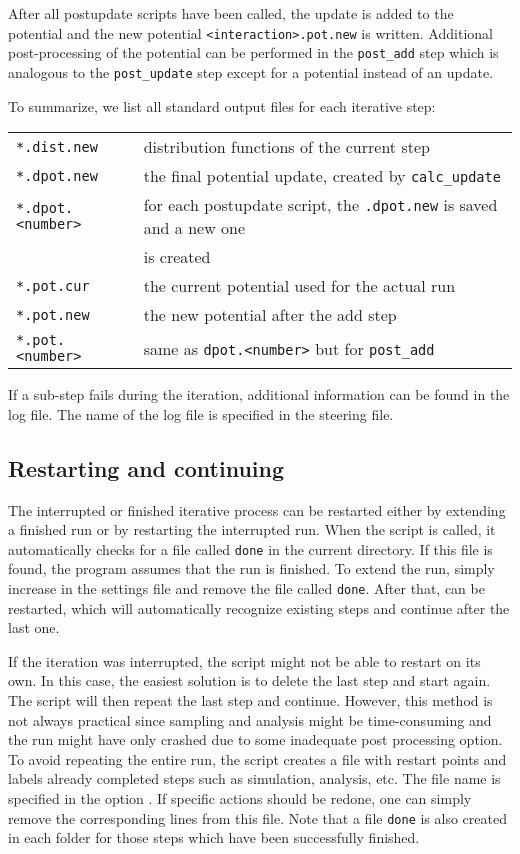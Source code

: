 After all postupdate scripts have been called, the update is added to the potential and the new potential \texttt{<interaction>.pot.new} is written. Additional post-processing of the potential can be performed in the \texttt{post\_add} step which is analogous to the \texttt{post\_update} step except for a potential instead of an update.

To summarize, we list all standard output files for each iterative step:

\begin{tabular}{ll}
\texttt{*.dist.new} & distribution functions of the current step \\
\texttt{*.dpot.new} & the final potential update, created by \texttt{calc\_update} \\
\texttt{*.dpot.<number>} & for each postupdate script, the \texttt{.dpot.new} is saved and a new one\\
&is created\\
\texttt{*.pot.cur} & the current potential used for the actual run\\
\texttt{*.pot.new} & the new potential after the add step \\
\texttt{*.pot.<number>} & same as \texttt{dpot.<number>} but for \texttt{post\_add}
\end{tabular}

If a sub-step fails during the iteration, additional information can be found in the log file. The name of the log file is specified in the steering \xml file.

\subsection{Restarting and continuing}
The interrupted or finished iterative process can be restarted either by extending a finished run or by restarting the interrupted run. When the script  is called, it automatically checks for a file called \texttt{done} in the current directory. If this file is found, the program assumes that the run is finished. To extend the run, simply increase  in the settings file and remove the file called \texttt{done}. After that,  can be restarted, which will automatically recognize existing steps and continue after the last one.

If the iteration was interrupted, the script  might not be able to restart on its own. In this case, the easiest solution is to delete the last step and start again. The script will then repeat the last step and continue. However, this method is not always practical since sampling and analysis might be time-consuming and the run might have only crashed due to some inadequate post processing option. To avoid repeating the entire run, the script  creates a file with restart points and labels already completed steps such as simulation, analysis, etc. The file name is specified in the option . If specific actions should be redone, one can simply remove the corresponding lines from this file. Note that a file \texttt{done} is also created in each folder for those steps which have been successfully finished.


